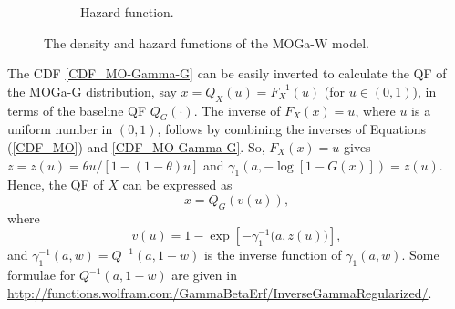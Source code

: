 \documentclass[twoside,leqno,11pt]{article}
\begin{document}
\begin{figure}[H]
\begin{subfigure}[b]{0.49\textwidth}
		\caption{Hazard function.}
		\label{fig:hazard}
	\end{subfigure}
\caption{The density and hazard functions of the MOGa-W model.}
\label{formas}
\end{figure}

\vspace{0.6cm}

The CDF \eqref{CDF_MO-Gamma-G} can be easily inverted to 
calculate the QF of the MOGa-G distribution, say $x=Q_{X}(u)=F_X^{-1}(u)$ (for $u \in (0,1)$), in terms of 
the baseline QF $Q_G(\cdot)$. The inverse of
$F_{X}(x)=u$, where $u$ is a uniform number in $(0,1)$, 
follows by combining the inverses of Equations (\ref{CDF_MO}) and \eqref{CDF_MO-Gamma-G}. So, $F_{X}(x)=u$ gives 
$z=z(u)=\theta u/[1-(1-\theta)u]$ and $\gamma_{1}\left(a, -\log[1-G(x)]\right)=z(u)$. Hence, the QF of $X$ can be 
expressed as
$$x=Q_G\left(v(u)\right),$$
where
$$v(u)=1-\exp\left[-\gamma_1^{-1}\big(a,z(u)\big)\right],$$
and $\gamma_1^{-1}(a,w)=Q^{-1}(a,1-w)$ is the inverse function of $\gamma_1(a,w)$. Some formulae for
$Q^{-1}(a,1-w)$ are given in \url{http://functions.wolfram.com/GammaBetaErf/InverseGammaRegularized/}.
\end{document}
